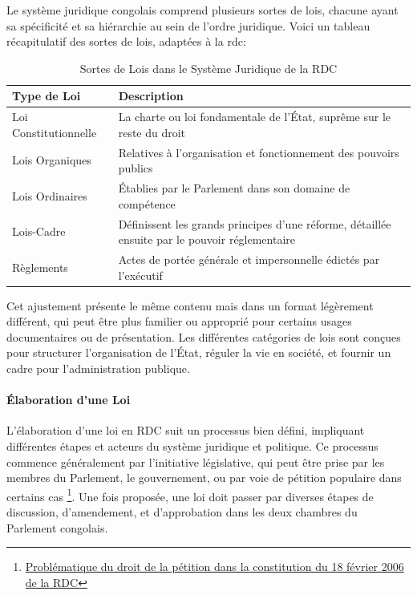 Le système juridique congolais comprend plusieurs sortes de lois, chacune ayant sa spécificité et sa hiérarchie au sein de l'ordre juridique. Voici un tableau récapitulatif des sortes de lois, adaptées à la \ac{rdc}:

\begin{table}[h]
\centering
\begin{tabular}{|l|p{10.5cm}|}
\hline
\textbf{Type de Loi} & \textbf{Description} \\ \hline
Loi Constitutionnelle & La charte ou loi fondamentale de l'État, suprême sur le reste du droit \\ \hline
Lois Organiques & Relatives à l'organisation et fonctionnement des pouvoirs publics \\ \hline
Lois Ordinaires & Établies par le Parlement dans son domaine de compétence \\ \hline
Lois-Cadre & Définissent les grands principes d'une réforme, détaillée ensuite par le pouvoir réglementaire \\ \hline
Règlements & Actes de portée générale et impersonnelle édictés par l'exécutif \\ \hline
\end{tabular}
\caption{Sortes de Lois dans le Système Juridique de la RDC}
\end{table}

Cet ajustement présente le même contenu mais dans un format légèrement différent, qui peut être plus familier ou approprié pour certains usages documentaires ou de présentation. Les différentes catégories de lois sont conçues pour structurer l'organisation de l'État, réguler la vie en société, et fournir un cadre pour l'administration publique.


\paragraph{Élaboration d'une Loi} \hspace{0pt}

L'élaboration d'une loi en RDC suit un processus bien défini, impliquant différentes étapes et acteurs du système juridique et politique. Ce processus commence généralement par l'initiative législative, qui peut être prise par les membres du Parlement, le gouvernement, ou par voie de pétition populaire dans certains cas \footnote{\href{https://www.memoireonline.com/12/12/6552/Problematique-du-droit-de-la-petition-dans-la-constitution-du-18-fevrier-2006-de-la-RDC.html}{Problématique du droit de la pétition dans la constitution du 18 février 2006 de la RDC}}. Une fois proposée, une loi doit passer par diverses étapes de discussion, d'amendement, et d'approbation dans les deux chambres du Parlement congolais.

